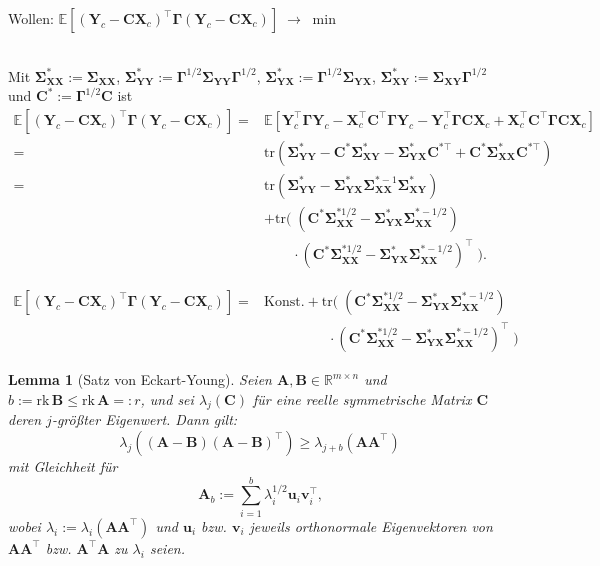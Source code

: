 \documentclass[12pt, aspectratio=169]{beamer}
\newcommand{\E}{\mathbb{E}}
\newcommand{\R}{\mathbb{R}}
\newcommand{\X}{\mathbf{X}}
\newcommand{\Y}{\mathbf{Y}}
\newcommand{\Ssigma}{\bm{\Sigma}}
\newcommand{\C}{\mathbf{C}}
\newcommand{\rk}{\mathrm{rk}}
\newcommand{\A}{\mathbf{A}}
\newcommand{\B}{\mathbf{B}}
\newcommand{\Ggamma}{\bm{\Gamma}}
\newcommand{\tr}{\mathrm{tr}}
\newtheorem{dlemma}[ddefinition]{Lemma}
\begin{document}
\begin{frame}
	\begin{alertblock}{}
		\begin{center}
			Wollen: $\E[(\Y_c - \C \X_c)^\top \Ggamma (\Y_c - \C \X_c)] \; \rightarrow \; \min$
		\end{center}
	\end{alertblock}
$\;$ \\
	Mit $\Ssigma_{\X\X}^\ast := \Ssigma_{\X\X}$, $\Ssigma_{\Y\Y}^\ast := \Ggamma^{1/2} \Ssigma_{\Y\Y} \Ggamma^{1/2}$, $\Ssigma_{\Y\X}^\ast := \Ggamma^{1/2} \Ssigma_{\Y\X}$, $\Ssigma_{\X\Y}^\ast := \Ssigma_{\X\Y} \Ggamma^{1/2}$ und $\C^\ast := \Ggamma^{1/2} \C$ ist
	\begin{align*}
	\E[(\Y_c - \C \X_c)^\top \Ggamma (\Y_c - \C \X_c)] ={}& \E[\Y_c^\top \Ggamma \Y_c - \X_c^\top \C^\top \Ggamma \Y_c - \Y_c^\top \Ggamma \C
	\X_c + \X_c^\top \C^\top \Ggamma \C \X_c] \\
	={}& \tr(\Ssigma_{\Y\Y}^\ast - \C^\ast \Ssigma_{\X\Y}^\ast - \Ssigma_{\Y\X}^\ast \C^{\ast
		\top} + \C^\ast \Ssigma_{\X\X}^\ast \C^{\ast \top}) \\
	={}& \tr(\Ssigma_{\Y\Y}^\ast - \Ssigma_{\Y\X}^\ast \Ssigma_{\X\X}^{\ast -1}
	\Ssigma_{\X\Y}^\ast) \\
	&+ \tr( \; (\C^\ast \Ssigma_{\X\X}^{\ast 1/2} - \Ssigma_{\Y\X}^\ast \Ssigma_{\X\X}^{\ast -1/2}) \\
	& \qquad \cdot (\C^\ast \Ssigma_{\X\X}^{\ast 1/2} - \Ssigma_{\Y\X}^\ast \Ssigma_{\X\X}^{\ast -1/2})^\top \; ).                                                  
	\end{align*}
\end{frame}

\begin{frame}
\begin{alertblock}{}
	\setlength\abovedisplayskip{0pt}
	\begin{align*}
		\E[(\Y_c - \C \X_c)^\top \Ggamma (\Y_c - \C \X_c)] ={}& \text{Konst.} 
		+ \tr( \; (\C^\ast \Ssigma_{\X\X}^{\ast 1/2} - \Ssigma_{\Y\X}^\ast \Ssigma_{\X\X}^{\ast -1/2}) \\
		&  \;\; \quad \quad \qquad \cdot (\C^\ast \Ssigma_{\X\X}^{\ast 1/2} - \Ssigma_{\Y\X}^\ast \Ssigma_{\X\X}^{\ast -1/2})^\top \;)
	\end{align*}
\end{alertblock}
\begin{dlemma}[Satz von Eckart-Young]
	Seien $\A, \B \in \R^{m \times n}$ und $b := \rk \, \B \leq \rk \, \A =: r$, und sei
	$\lambda_j(\C)$ für eine reelle symmetrische Matrix $\C$ deren $j$-größter Eigenwert.
	Dann gilt:
	$$\lambda_j((\A - \B)(\A - \B)^\top) \geq \lambda_{j+b}(\A \A^\top)$$
	mit Gleichheit für
	$$\A_b := \sum_{i=1}^{b} \lambda_i^{1/2} \mathbf{u}_i \mathbf{v}_i^\top \text{,}$$
	wobei $\lambda_i := \lambda_i(\A \A^\top)$ und $\mathbf{u}_i$ bzw. $\mathbf{v}_i$ jeweils orthonormale Eigenvektoren von $\A \A^\top$ bzw. 
	$\A^\top \A$ zu $\lambda_i$ seien.
\end{dlemma}
\end{frame}
\end{document}
